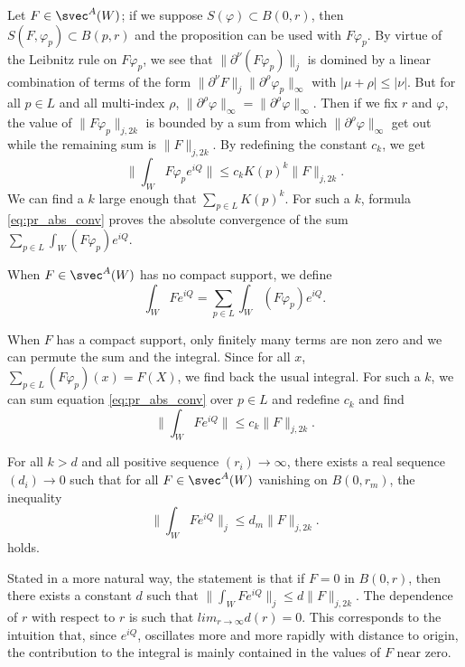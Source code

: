 Let $F\in\svec^A(W)$; if we suppose $S(\varphi)\subset B(0,r)$, then $S(F,\varphi_p)\subset B(p,r)$ and the proposition can be used with $F\varphi_p$. By virtue of the Leibnitz rule on $F\varphi_p$, we see that $\| \partial^{\nu}(F\varphi_p) \|_j$ is domined by a linear combination of terms of the form $\| \partial^{\nu}F \|_j\| \partial^{\rho}\varphi_p \|_{\infty}$ with $| \mu+\rho |\leq | \nu |$. But for all $p\in L$ and all multi-index $\rho$, $\| \partial^{\rho}\varphi \|_{\infty}=\| \partial^{\rho}\varphi \|_{\infty}$. Then if we fix $r$ and $\varphi$, the value of $\| F\varphi_p \|_{j,2k}$ is bounded by a sum from which  $\| \partial^{\rho}\varphi \|_{\infty}$ get out while the remaining sum is $\| F \|_{j,2k}$. By redefining the constant $c_k$, we get
\begin{equation} \label{eq:pr_abs_conv}
  \| \int_WF\varphi_pe^{iQ} \|\leq c_kK(p)^k\| F \|_{j,2k}.
\end{equation}
We can find a $k$ large enough that $\sum_{p\in L}K(p)^k$. For such a $k$, formula \eqref{eq:pr_abs_conv} proves the absolute convergence of the sum $\sum_{p\in L}\int_W(F\varphi_p)e^{iQ}$.

\begin{definition} \label{def:intFeiQ}
  When $F\in\svec^A(W)$ has no compact support, we define
\begin{equation}
   \int_WFe^{iQ}=\sum_{p\in L}\int_W(F\varphi_p)e^{iQ}.
\end{equation}

\end{definition}
When $F$ has a compact support, only finitely many terms are non zero and we can permute the sum and the integral. Since for all $x$, $\sum_{p\in L}(F\varphi_p)(x)=F(X)$, we find back the usual integral. For such a $k$, we can sum equation \eqref{eq:pr_abs_conv} over $p\in L$ and redefine $c_k$ and find
\[ 
  \| \int_W Fe^{iQ} \|\leq c_k\| F \|_{j,2k}.
\]

\begin{proposition}   \label{prop:leqd_m}
  For all $k>d$ and all positive sequence $(r_i)\to\infty$, there exists a real sequence $(d_i)\to 0$ such that for all $F\in\svec^A(W)$ vanishing on $B(0,r_m)$, the inequality
\[ 
  \| \int_WFe^{iQ} \|_j\leq d_m\| F \|_{j,2k}.
\]
holds.
\end{proposition}

Stated in a more natural way, the statement is that if $F=0$ in $B(0,r)$, then there exists a constant $d$ such that $\| \int_WFe^{iQ} \|_j\leq d\| F \|_{j,2k}$. The dependence of $r$ with respect to $r$ is such that $lim_{r\to\infty}d(r)=0$. This corresponds to the intuition that, since $e^{iQ}$, oscillates more and more rapidly with distance to origin, the contribution to the integral is mainly contained in the values of $F$ near zero.

